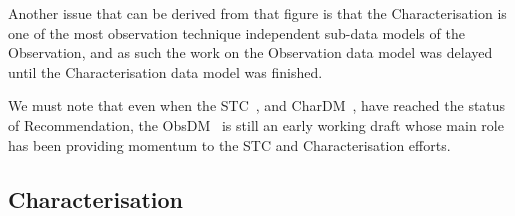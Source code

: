			Another issue that can be derived from that figure is
			that the Characterisation is one of the most observation
			technique independent sub-data models of the
			Observation, and as such the work on the Observation
			data model was delayed until the Characterisation data
			model was finished.
			
			 We must note that even when the
			STC~\cite{2007stc..ivoa.....R}, and
			CharDM~\cite{2008dmadcrept.....L}, have reached the
			status of Recommendation, the
			ObsDM~\cite{2005dmo..rept.....M} is still an early
			working draft whose main role has been providing
			momentum to the STC and Characterisation efforts.
		

		\subsection{Characterisation} %
		\label{sec:the_ivoa_characterisation_data_model}
			

